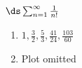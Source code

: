 {$\ds \sum_{n=1}^\infty \frac{1}{n!}$
}
{\begin{enumerate}
\item	$1,\frac{3}{2},\frac{5}{3},\frac{41}{24},\frac{103}{60}$
\item	Plot omitted
\end{enumerate}
}
